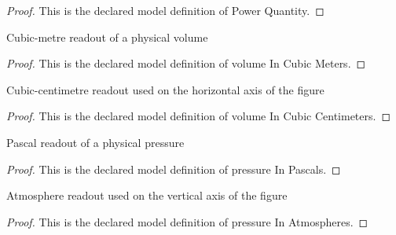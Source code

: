 \begin{proof}
  This is the declared model definition of Power Quantity.
\end{proof}
\begin{definition}
  \label{def:physics:phyx-mini-0438:phyxminiproblems-problemphyxmini0438-volumeincubicmeters}
  Cubic-metre readout of a physical volume
\end{definition}
\begin{proof}
  This is the declared model definition of volume In Cubic Meters.
\end{proof}
\begin{definition}
  \label{def:physics:phyx-mini-0438:phyxminiproblems-problemphyxmini0438-volumeincubiccentimeters}
  Cubic-centimetre readout used on the horizontal axis of the figure
\end{definition}
\begin{proof}
  This is the declared model definition of volume In Cubic Centimeters.
\end{proof}
\begin{definition}
  \label{def:physics:phyx-mini-0438:phyxminiproblems-problemphyxmini0438-pressureinpascals}
  Pascal readout of a physical pressure
\end{definition}
\begin{proof}
  This is the declared model definition of pressure In Pascals.
\end{proof}
\begin{definition}
  \label{def:physics:phyx-mini-0438:phyxminiproblems-problemphyxmini0438-pressureinatmospheres}
  Atmosphere readout used on the vertical axis of the figure
\end{definition}
\begin{proof}
  This is the declared model definition of pressure In Atmospheres.
\end{proof}
